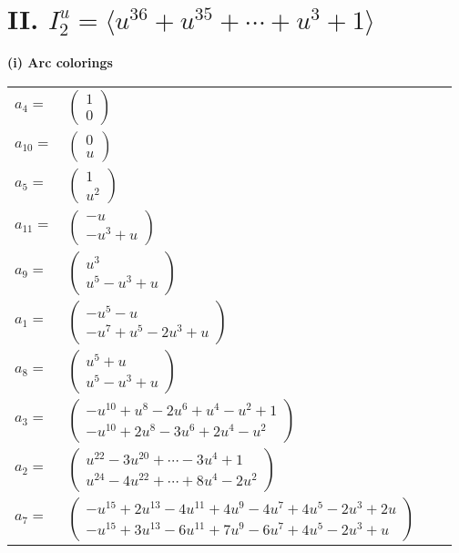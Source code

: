 \documentclass[1p]{elsarticle_modified}
\theoremstyle{definition}
\begin{document}
\centering \section*{II. $I^u_{2}= \langle u^{36}+u^{35}+\cdots+u^3+1 \rangle$}
\flushleft \textbf{(i) Arc colorings}\\
\begin{tabular}{m{7pt} m{180pt} m{7pt} m{180pt} }
\flushright $a_{4}=$&$\begin{pmatrix}1\\0\end{pmatrix}$ \\
\flushright $a_{10}=$&$\begin{pmatrix}0\\u\end{pmatrix}$ \\
\flushright $a_{5}=$&$\begin{pmatrix}1\\u^2\end{pmatrix}$ \\
\flushright $a_{11}=$&$\begin{pmatrix}- u\\- u^3+u\end{pmatrix}$ \\
\flushright $a_{9}=$&$\begin{pmatrix}u^3\\u^5- u^3+u\end{pmatrix}$ \\
\flushright $a_{1}=$&$\begin{pmatrix}- u^5- u\\- u^7+u^5-2 u^3+u\end{pmatrix}$ \\
\flushright $a_{8}=$&$\begin{pmatrix}u^5+u\\u^5- u^3+u\end{pmatrix}$ \\
\flushright $a_{3}=$&$\begin{pmatrix}- u^{10}+u^8-2 u^6+u^4- u^2+1\\- u^{10}+2 u^8-3 u^6+2 u^4- u^2\end{pmatrix}$ \\
\flushright $a_{2}=$&$\begin{pmatrix}u^{22}-3 u^{20}+\cdots-3 u^4+1\\u^{24}-4 u^{22}+\cdots+8 u^4-2 u^2\end{pmatrix}$ \\
\flushright $a_{7}=$&$\begin{pmatrix}- u^{15}+2 u^{13}-4 u^{11}+4 u^9-4 u^7+4 u^5-2 u^3+2 u\\- u^{15}+3 u^{13}-6 u^{11}+7 u^9-6 u^7+4 u^5-2 u^3+u\end{pmatrix}$ \\

\end{tabular}
\end{document}
